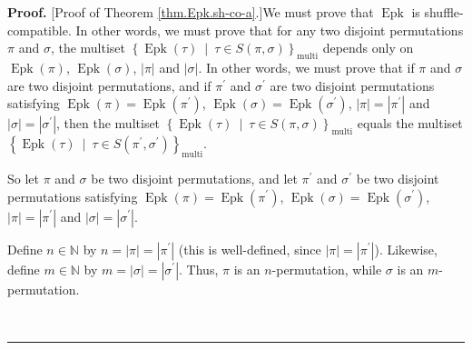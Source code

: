 \documentclass[numbers=enddot,12pt,final,onecolumn,notitlepage]{scrartcl}%
\theoremstyle{definition}
\newenvironment{proof}[1][Proof]{\noindent\textbf{#1.} }{\ \rule{0.5em}{0.5em}}
\begin{document}
\begin{proof}
[Proof of Theorem \ref{thm.Epk.sh-co-a}.]We must prove that
$\operatorname*{Epk}$ is shuffle-compatible. In other words, we must prove
that for any two disjoint permutations $\pi$ and $\sigma$, the multiset
$\left\{  \operatorname*{Epk}\left(  \tau\right)  \ \mid\ \tau\in S\left(
\pi,\sigma\right)  \right\}  _{\operatorname*{multi}}$ depends only on
$\operatorname*{Epk}\left(  \pi\right)  $, $\operatorname*{Epk}\left(
\sigma\right)  $, $\left\vert \pi\right\vert $ and $\left\vert \sigma
\right\vert $. In other words, we must prove that if $\pi$ and $\sigma$ are
two disjoint permutations, and if $\pi^{\prime}$ and $\sigma^{\prime}$ are two
disjoint permutations satisfying $\operatorname*{Epk}\left(  \pi\right)
=\operatorname*{Epk}\left(  \pi^{\prime}\right)  $, $\operatorname*{Epk}%
\left(  \sigma\right)  =\operatorname*{Epk}\left(  \sigma^{\prime}\right)  $,
$\left\vert \pi\right\vert =\left\vert \pi^{\prime}\right\vert $ and
$\left\vert \sigma\right\vert =\left\vert \sigma^{\prime}\right\vert $, then
the multiset $\left\{  \operatorname*{Epk}\left(  \tau\right)  \ \mid\ \tau\in
S\left(  \pi,\sigma\right)  \right\}  _{\operatorname*{multi}}$ equals the
multiset $\left\{  \operatorname*{Epk}\left(  \tau\right)  \ \mid\ \tau\in
S\left(  \pi^{\prime},\sigma^{\prime}\right)  \right\}
_{\operatorname*{multi}}$.

So let $\pi$ and $\sigma$ be two disjoint permutations, and let $\pi^{\prime}$
and $\sigma^{\prime}$ be two disjoint permutations satisfying
$\operatorname*{Epk}\left(  \pi\right)  =\operatorname*{Epk}\left(
\pi^{\prime}\right)  $, $\operatorname*{Epk}\left(  \sigma\right)
=\operatorname*{Epk}\left(  \sigma^{\prime}\right)  $, $\left\vert
\pi\right\vert =\left\vert \pi^{\prime}\right\vert $ and $\left\vert
\sigma\right\vert =\left\vert \sigma^{\prime}\right\vert $.

Define $n\in\mathbb{N}$ by $n=\left\vert \pi\right\vert =\left\vert
\pi^{\prime}\right\vert $ (this is well-defined, since $\left\vert
\pi\right\vert =\left\vert \pi^{\prime}\right\vert $). Likewise, define
$m\in\mathbb{N}$ by $m=\left\vert \sigma\right\vert =\left\vert \sigma
^{\prime}\right\vert $. Thus, $\pi$ is an $n$-permutation, while $\sigma$ is
an $m$-permutation.


\end{proof}
\end{document}
